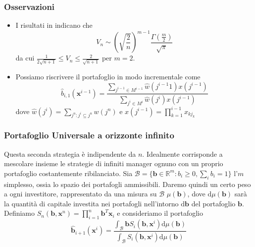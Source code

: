 \documentclass{beamer}
\theoremstyle{plain}
\theoremstyle{definition}
\theoremstyle{remark}
\newcommand{\R}{\mathbb{R}}
\newcommand{\x}{\bm{x}}
\newcommand{\B}{\bm{b}}
\newcommand{\bh}{\hat{\bm{b}}}
\newcommand{\dmu}{\text{d}\mu(\B)}
\begin{document}
\begin{frame}
	\frametitle{Osservazioni}
	\begin{itemize}
		\item I risultati in \cite{Cost1998} indicano che
		\begin{equation*}
		V_n \sim \left(\sqrt{\frac{2}{n}}\right)^{m-1}\frac{\Gamma\left(\frac{m}{2}\right)}{\sqrt{\pi}}
		\end{equation*}
		da cui $\frac{1}{2\sqrt{n+1}}\leq V_n\leq \frac{2}{\sqrt{n+1}}$ per $m=2$.
	\item Possiamo riscrivere il portafoglio in modo incrementale come
	\begin{equation*}
	\hat{b}_{i,1}(\x^{i-1}) = \frac{\sum_{j^{i-1}\in M^{i-1}}{\hat{w}(j^{i-1}1)}x(j^{i-1})}{\sum_{j^{i}\in M^{i}}{\hat{w}(j^i)x(j^{i-1})}}
	\end{equation*}
	dove $\hat{w}(j^i) = \sum_{j^n:j^i\subseteq j^n}{w(j^n)}$ e $x(j^{i-1})=\prod_{k = 1}^{i-1}{x_{kj_k}}$
\end{itemize}
\end{frame}

\begin{frame}
	\frametitle{Portafoglio Universale a orizzonte infinito}
	Questa seconda strategia è indipendente da $n$. Idealmente corrisponde a mescolare insieme le strategie di infiniti manager ognuno con un proprio portafoglio costantemente ribilanciato.\newline
	Sia $\mathcal{B}=\{\B\in\R^m:b_i\geq 0,\sum_i{b_i}=1\}$ l'$m$ simplesso, ossia lo spazio dei portafogli ammissibili.
	Daremo quindi un certo peso a ogni investitore, rappresentato da una misura su $\mathcal{B}$ $\mu(\B)$, dove $\dmu$ sarà la quantità di capitale investita nei portafogli nell'intorno $\text{d}\B$ del portafoglio $\B$.\newline
	Definiamo $S_n(\B,\x^n)=\prod_{i = 1}^n {\B^T\x_i}$ e consideriamo il portafoglio
	\begin{equation}\label{portafuniv}
	\bh_{i+1}(\x^i)=\frac{\int_\mathcal{B}{\B S_i(\B,\x^i)\dmu}}{\int_\mathcal{B}{S_i(\B,\x^i)\dmu}}
	\end{equation}
\end{frame}
\end{document}
